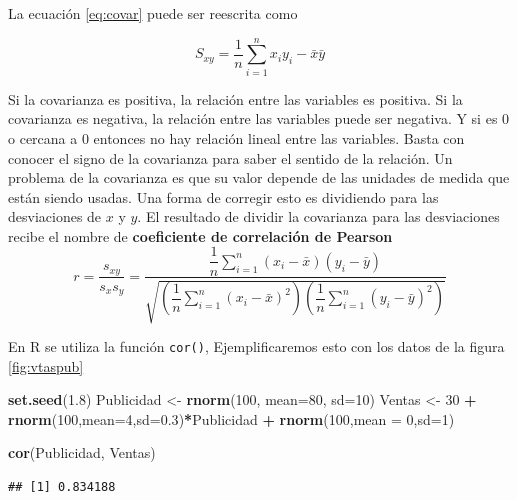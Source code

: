 \documentclass[
]{krantz}
\makeatletter
\newenvironment{Shaded}{\begin{snugshade}}{\end{snugshade}}
\newcommand{\DataTypeTok}[1]{\textcolor[rgb]{0.27,0.27,0.27}{#1}}
\newcommand{\DecValTok}[1]{\textcolor[rgb]{0.06,0.06,0.06}{#1}}
\newcommand{\FloatTok}[1]{\textcolor[rgb]{0.06,0.06,0.06}{#1}}
\newcommand{\KeywordTok}[1]{\textcolor[rgb]{0.27,0.27,0.27}{\textbf{#1}}}
\newcommand{\NormalTok}[1]{#1}
\newcommand{\OperatorTok}[1]{\textcolor[rgb]{0.43,0.43,0.43}{\textbf{#1}}}
\newcommand{\StringTok}[1]{\textcolor[rgb]{0.5,0.5,0.5}{#1}}
\newenvironment{kframe}{%
\medskip{}
\setlength{\fboxsep}{.8em}
 \def\at@end@of@kframe{}%
 \ifinner\ifhmode%
  \def\at@end@of@kframe{\end{minipage}}%
  \begin{minipage}{\columnwidth}%
 \fi\fi%
 \def\FrameCommand##1{\hskip\@totalleftmargin \hskip-\fboxsep
 \colorbox{shadecolor}{##1}\hskip-\fboxsep
     \hskip-\linewidth \hskip-\@totalleftmargin \hskip\columnwidth}%
 \MakeFramed {\advance\hsize-\width
   \@totalleftmargin\z@ \linewidth\hsize
   \@setminipage}}%
 {\par\unskip\endMakeFramed%
 \at@end@of@kframe}
\renewenvironment{Shaded}{\begin{kframe}}{\end{kframe}}
\makeatother
\begin{document}
La ecuación \eqref{eq:covar} puede ser reescrita como

\begin{equation} 
  S_{xy} = \dfrac{1}{n}\sum_{i=1}^{n}{x_iy_i}-\bar{x}\bar{y}
  \label{eq:covar2}
\end{equation}

Si la covarianza es positiva, la relación entre las variables es positiva. Si la covarianza es negativa, la relación entre las variables puede ser negativa. Y si es \(0\) o cercana a \(0\) entonces no hay relación lineal entre las variables. Basta con conocer el signo de la covarianza para saber el sentido de la relación. Un problema de la covarianza es que su valor depende de las unidades de medida que están siendo usadas. Una forma de corregir esto es dividiendo para las desviaciones de \(x\) y \(y\). El resultado de dividir la covarianza para las desviaciones recibe el nombre de \textbf{coeficiente de correlación de Pearson}
\begin{equation} 
  r=\dfrac{s_{xy}}{s_xs_y}=\dfrac{\dfrac{1}{n} \sum_{i=1}^{n}\left(x_i-\bar{x}\right)\left(y_i-\bar{y}\right)}{\sqrt{\left(\dfrac{1}{n} \sum_{i=1}^{n}\left(x_i-\bar{x}\right)^2\right)\left(\dfrac{1}{n} \sum_{i=1}^{n}\left(y_i-\bar{y}\right)^2\right)}}
  \label{eq:covar3}
\end{equation}

En R se utiliza la función \texttt{cor()}, Ejemplificaremos esto con los datos de la figura \ref{fig:vtaspub}

\begin{Shaded}
\begin{Highlighting}[]
\KeywordTok{set.seed}\NormalTok{(}\FloatTok{1.8}\NormalTok{)}
\NormalTok{Publicidad <-}\StringTok{ }\KeywordTok{rnorm}\NormalTok{(}\DecValTok{100}\NormalTok{, }\DataTypeTok{mean=}\DecValTok{80}\NormalTok{, }\DataTypeTok{sd=}\DecValTok{10}\NormalTok{)}
\NormalTok{Ventas <-}\StringTok{ }\DecValTok{30} \OperatorTok{+}\StringTok{ }\KeywordTok{rnorm}\NormalTok{(}\DecValTok{100}\NormalTok{,}\DataTypeTok{mean=}\DecValTok{4}\NormalTok{,}\DataTypeTok{sd=}\FloatTok{0.3}\NormalTok{)}\OperatorTok{*}\NormalTok{Publicidad }\OperatorTok{+}\StringTok{ }\KeywordTok{rnorm}\NormalTok{(}\DecValTok{100}\NormalTok{,}\DataTypeTok{mean =} \DecValTok{0}\NormalTok{,}\DataTypeTok{sd=}\DecValTok{1}\NormalTok{)}

\KeywordTok{cor}\NormalTok{(Publicidad, Ventas)}
\end{Highlighting}
\end{Shaded}

\begin{verbatim}
## [1] 0.834188
\end{verbatim}
\end{document}
